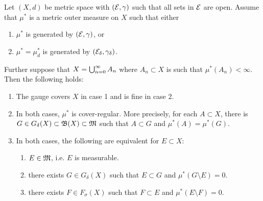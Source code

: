\documentclass[a4paper]{article}
\begin{document}
\begin{thm}
  Let $(X, d)$ be metric space with $(\mathcal{E}, \gamma)$ such that
  all sets in $\mathcal{E}$ are open. Assume that $\mu^*$ is a metric 
  outer measure on $X$ such that either 
  
  \begin{enumerate}
    \item $\mu^*$ is generated by $(\mathcal{E}, \gamma)$, or 
    \item $\mu^* = \mu^*_d$ is generated by $(\mathcal{E}_\delta, 
    \gamma_\delta)$.
  \end{enumerate}

  Further suppose that $X = \bigcup_{n=0}^\infty A_n$ where $A_n \subset X$
  is such that $\mu^*(A_n) < \infty$. Then the following holds:

  \begin{enumerate}
    \item The gauge covers $X$ in case 1 and is fine in case 
    2. 
    \item In both cases, $\mu^*$ is cover-regular. More precisely,
    for each $A \subset X$, there is $G \in G_\delta(X) \subset \mathfrak{B}(X)
    \subset \mathfrak{M}$ such that $A \subset G$ and $\mu^*(A) = \mu^*(G)$.
    \item In both cases, the following are equivalent for 
    $E \subset X$: 
    \begin{enumerate}
      \item $E \in \mathfrak{M}$, i.e. $E$ is measurable.
      \item there exists $G \in G_\delta(X)$ such that 
      $E \subset G$ and $\mu^*(G \setminus E) = 0$.
      \item there exists $F \in F_\sigma(X)$ such that 
      $F \subset E$ and $\mu^* (E \setminus F) = 0$.
    \end{enumerate}
  \end{enumerate}
\end{thm}
\end{document}
